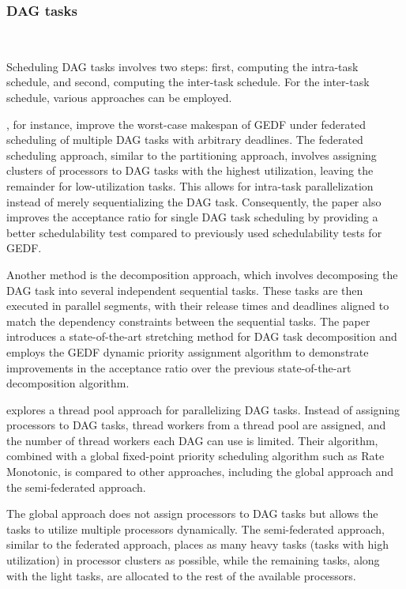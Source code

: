 \subsubsection{DAG tasks}
~

Scheduling DAG tasks involves two steps: first, 
computing the intra-task schedule, and second, computing 
the inter-task schedule. For the inter-task schedule, various 
approaches can be employed.

\cite{WangGEDFDag2019}, for instance, improve the worst-case 
makespan of GEDF under federated scheduling of multiple DAG tasks 
with arbitrary deadlines. The federated scheduling approach, 
similar to the partitioning approach, involves assigning clusters 
of processors to DAG tasks with the highest utilization, leaving 
the remainder for low-utilization tasks. This allows for 
intra-task parallelization instead of merely sequentializing 
the DAG task. Consequently, the paper also improves the acceptance 
ratio for single DAG task scheduling by providing a better 
schedulability test compared to previously used 
schedulability tests for GEDF.

Another method is the decomposition approach, which involves 
decomposing the DAG task into several independent sequential tasks. 
These tasks are then executed in parallel segments, with their 
release times and deadlines aligned to match the dependency constraints 
between the sequential tasks\cite{CaoStretchingDAGs2020}. The paper 
\cite{CaoStretchingDAGs2020} introduces a state-of-the-art 
stretching method for DAG task decomposition and employs the GEDF 
dynamic priority assignment algorithm to demonstrate improvements 
in the acceptance ratio over the previous state-of-the-art 
decomposition algorithm.

\cite{SchmidResponseDAGThreadpools2021} explores a thread pool 
approach for parallelizing DAG tasks. Instead of assigning 
processors to DAG tasks, thread workers from a thread pool are 
assigned, and the number of thread workers each DAG can use is 
limited. Their algorithm, combined with a global fixed-point 
priority scheduling algorithm such as Rate Monotonic, is compared 
to other approaches, including the global approach and the 
semi-federated approach.

The global approach does not assign processors to DAG tasks but 
allows the tasks to utilize multiple processors dynamically. 
The semi-federated approach, similar to the federated approach, 
places as many heavy tasks (tasks with high utilization) in processor 
clusters as possible, while the remaining tasks, along with the 
light tasks, are allocated to the rest of the available processors.

